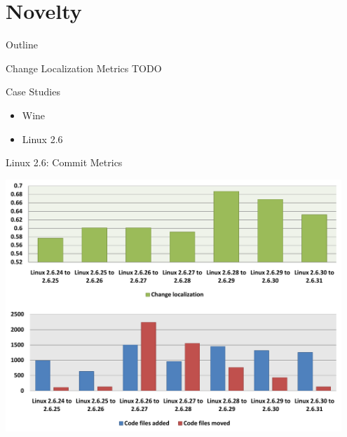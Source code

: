 

\section{Novelty}

\begin{frame}{Outline}
  \tableofcontents[current]
\end{frame}


\begin{frame}{Change Localization Metrics}
  TODO
\end{frame}


\begin{frame}{Case Studies}
  \begin{itemize}
  \item Wine
  \item Linux 2.6
  \end{itemize}
\end{frame}


\begin{frame}{Linux 2.6: Commit Metrics}

  \begin{center}
    \includegraphics[width=0.95\textwidth]{minings/linux-2-6-commit-metrics}
  \end{center}

\end{frame}


